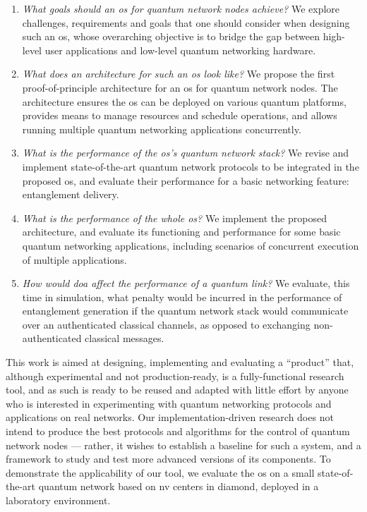 \begin{enumerate}[label={Q\arabic*.}]
    \item \emph{What goals should an \acrshort{os} for quantum network nodes achieve?} We explore
          challenges, requirements and goals that one should consider when designing such an
          \acrshort{os}, whose overarching objective is to bridge the gap between high-level user
          applications and low-level quantum networking hardware.
    \item \emph{What does an architecture for such an \acrshort{os} look like?} We propose the first
          proof-of-principle architecture for an \acrshort{os} for quantum network nodes. The
          architecture ensures the \acrshort{os} can be deployed on various quantum platforms,
          provides means to manage resources and schedule operations, and allows running multiple
          quantum networking applications concurrently.
    \item \emph{What is the performance of the \acrshort{os}'s quantum network stack?} We revise and
          implement state-of-the-art quantum network protocols to be integrated in the proposed
          \acrshort{os}, and evaluate their performance for a basic networking feature: entanglement
          delivery.
    \item \emph{What is the performance of the whole \acrshort{os}?} We implement the proposed
          architecture, and evaluate its functioning and performance for some basic quantum
          networking applications, including scenarios of concurrent execution of multiple
          applications.
    \item \emph{How would \acrlong{doa} affect the performance of a quantum link?} We evaluate, this
          time in simulation, what penalty would be incurred in the performance of entanglement
          generation if the quantum network stack would communicate over an authenticated classical
          channels, as opposed to exchanging non-authenticated classical messages.
\end{enumerate}

This work is aimed at designing, implementing and evaluating a ``product'' that, although
experimental and not production-ready, is a fully-functional research tool, and as such is ready to
be reused and adapted with little effort by anyone who is interested in experimenting with quantum
networking protocols and applications on real networks. Our implementation-driven research does not
intend to produce the best protocols and algorithms for the control of quantum network nodes ---
rather, it wishes to establish a baseline for such a system, and a framework to study and test more
advanced versions of its components. To demonstrate the applicability of our tool, we evaluate the
\acrshort{os} on a small state-of-the-art quantum network based on \acrlong{nv} centers in diamond,
deployed in a laboratory environment.

